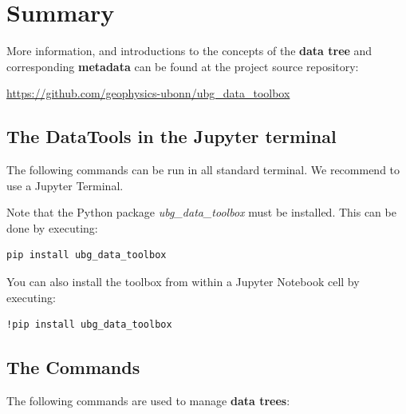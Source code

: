 \documentclass[fontsize=12]{scrartcl}
\begin{document}
\section{Summary}

More information, and introductions to the concepts of the \textbf{data tree}
and corresponding \textbf{metadata} can be found at the project source
repository:

\url{https://github.com/geophysics-ubonn/ubg_data_toolbox}

\subsection{The DataTools in the Jupyter terminal}

The following commands can be run in all standard terminal. We recommend to use
a Jupyter Terminal.

Note that the Python package \textsl{ubg\_data\_toolbox} must be installed. This
can be done by executing:

\begin{verbatim}
pip install ubg_data_toolbox
\end{verbatim}

You can also install the toolbox from within a Jupyter Notebook cell by
executing:

\begin{verbatim}
!pip install ubg_data_toolbox
\end{verbatim}


\subsection{The Commands}

The following commands are used to manage \textbf{data trees}:
\end{document}
